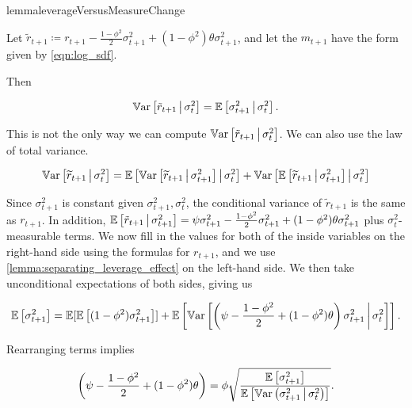 \documentclass[11pt, letterpaper, twoside, final]{article}
\begin{document}
\begin{restatable}{lemma}{leverageVersusMeasureChange}
    \label{lemma:separating_leverage_effect}

    Let $\tilde{r}_{t+1} \coloneqq r_{t+1} - \frac{1 - \phi^2}{2} \sigma^2_{t+1} + (1 - \phi^2) \theta
    \sigma^2_{t+1}$, and let the $m_{t+1}$ have the form given by \cref{eqn:log_sdf}.
    
    Then 
    
    \begin{equation}
        \operatorname{\mathbb{V}ar}\left[\tilde{r}_{t+1} \,\middle\vert\, \sigma^2_t \right] = \operatorname{\mathbb{E}}\left[\sigma^2_{t+1} \,\middle\vert\, \sigma^2_t\right].
    \end{equation}
\end{restatable}

This is not the only way we can compute $\operatorname{\mathbb{V}ar}\left[\tilde{r}_{t+1} \,\middle\vert\, \sigma^2_t \right]$.
We can also use the law of total variance.

\begin{equation}
    \operatorname{\mathbb{V}ar}\left[\widetilde{r}_{t+1} \,\middle\vert\, \sigma^2_t\right]  =
    \operatorname{\mathbb{E}}\left[\operatorname{\mathbb{V}ar}\left[\widetilde{r}_{t+1} \,\middle\vert\, \sigma^2_{t+1}\right] \,\middle\vert\, \sigma_t^2 \right] +
    \operatorname{\mathbb{V}ar}\left[\operatorname{\mathbb{E}}\left[\widetilde{r}_{t+1}\,\middle\vert\, \sigma_{t+1}^2\right] \,\middle\vert\, \sigma^2_t\right]
\end{equation}

Since $\sigma^2_{t+1}$ is constant given $\sigma^2_{t+1}, \sigma^2_t$, the conditional variance of
$\widetilde{r}_{t+1}$ is the same as $r_{t+1}$.
In addition, $\operatorname{\mathbb{E}}\left[\tilde{r}_{t+1} \,\middle\vert\, \sigma^2_{t+1}\right]  = \psi \sigma^2_{t+1} - \frac{1-\phi^2}{2}
\sigma^2_{t+1} + (1- \phi^2) \theta \sigma^2_{t+1}$ plus $\sigma^2_t$-measurable terms.
We now fill in the values for both of the inside variables on the right-hand side using the formulas for
$r_{t+1}$, and we use \cref{lemma:separating_leverage_effect} on the left-hand side. 
We then take unconditional expectations of both sides, giving  us

\begin{equation}
    \operatorname{\mathbb{E}}\left[\sigma^2_{t+1} \right]  = \operatorname{\mathbb{E}}[ \operatorname{\mathbb{E}}\left[(1 - \phi^2) \sigma^2_{t+1} \right]] +
    \operatorname{\mathbb{E}}\left[\operatorname{\mathbb{V}ar}\left[\left(\psi - \frac{1-\phi^2}{2} + (1-\phi^2)\theta\right) \sigma^2_{t+1} \,\middle\vert\,
    \sigma^2_t\right]\right].
\end{equation}

Rearranging terms implies 

\begin{equation}
    \label{eqn:psi_tilde_eqn}
    \left(\psi - \frac{1-\phi^2}{2} + (1-\phi^2)\theta\right) = \phi \sqrt{\frac{\operatorname{\mathbb{E}}\left[\sigma^2_{t+1}
    \right]}{\operatorname{\mathbb{E}} \left[\operatorname{\mathbb{V}ar}\left(\sigma^2_{t+1} \,\middle\vert\, \sigma^2_t\right)\right]}}.
\end{equation}
\end{document}
